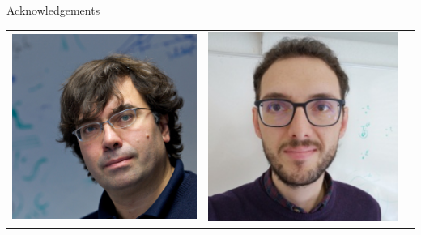 \documentclass[xcolor=table,aspectratio=169]{beamer}
\numberwithin{equation}{section}
\begin{document}
\begingroup
{}
\begin{frame}{Acknowledgements}
   \begin{center}
      \footnotesize
      \begin{tabularx}{0.7\textwidth}{CCC}
         \includegraphics[height = 0.3\paperheight]{figures/nicola_marzari.jpg}  &
         \includegraphics[height = 0.3\paperheight]{figures/nicola_colonna2.png} &

\end{tabularx}
\end{center}
\end{frame}
\end{document}
